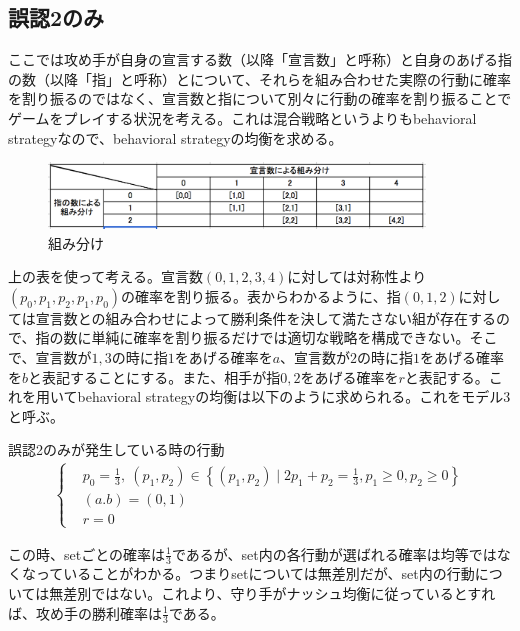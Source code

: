\documentclass{jsarticle}
\begin{document}
\subsection{誤認2のみ}
ここでは攻め手が自身の宣言する数（以降「宣言数」と呼称）と自身のあげる指の数（以降「指」と呼称）とについて、それらを組み合わせた実際の行動に確率を割り振るのではなく、宣言数と指について別々に行動の確率を割り振ることでゲームをプレイする状況を考える。これは混合戦略というよりもbehavioral strategyなので、behavioral strategyの均衡を求める。
\begin{figure}[h]
    \centering
    \includegraphics[width=10cm]{class2.png}
    \caption{組み分け}
\end{figure}

上の表を使って考える。宣言数$(0,1,2,3,4)$に対しては対称性より$(p_0, p_1, p_2, p_1, p_0)$の確率を割り振る。表からわかるように、指$(0,1,2)$に対しては宣言数との組み合わせによって勝利条件を決して満たさない組が存在するので、指の数に単純に確率を割り振るだけでは適切な戦略を構成できない。そこで、宣言数が$1, 3$の時に指$1$をあげる確率を$a$、宣言数が$2$の時に指$1$をあげる確率を$b$と表記することにする。また、相手が指$0,2$をあげる確率を$r$と表記する。これを用いてbehavioral strategyの均衡は以下のように求められる。これをモデル3と呼ぶ。

\begin{itembox}[l]{誤認2のみが発生している時の行動}
\begin{align}
	\begin{cases}
    	&p_0 = \frac{1}{3},\ (p_1, p_2) \in \left\{ (p_1, p_2) \mid 2p_1 + p_2 = \frac{1}{3}, p_1 \geq 0, p_2 \geq 0\right\}\\[10pt]
	&(a.b) = (0,1)\\[10pt]
	&r = 0
	\end{cases}
\end{align}
\end{itembox}
この時、setごとの確率は$\frac{1}{3}$であるが、set内の各行動が選ばれる確率は均等ではなくなっていることがわかる。つまりsetについては無差別だが、set内の行動については無差別ではない。これより、守り手がナッシュ均衡に従っているとすれば、攻め手の勝利確率は$\frac{1}{3}$である。
\end{document}

